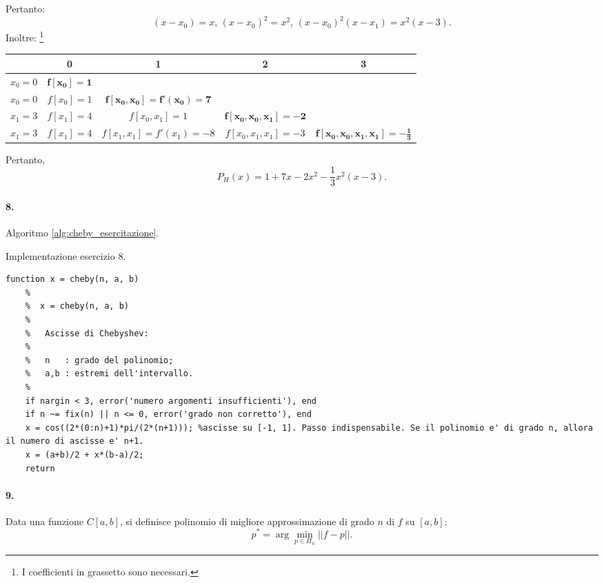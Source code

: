 \noindent Pertanto:
\begin{equation*}
    (x-x_0)=x,\, (x-x_0)^2 = x^2,\, (x-x_0)^2(x-x_1) = x^2(x-3).
\end{equation*}
Inoltre: \footnote{I coefficienti in grassetto sono necessari.}
\begin{center}
    \begin{tabular}{c|cccc}
         & 0 & 1 & 2 & 3\\
         \hline
         $x_0 = 0$ & $\boldsymbol{f[x_0]=1}$\\ 
         $x_0 = 0$ & $f[x_0]=1$ & $\boldsymbol{f[x_0,x_0]=f'(x_0)=7}$\\
         $x_1=3$ & $f[x_1]=4$ & $f[x_0,x_1]=1$ & $\boldsymbol{f[x_0,x_0,x_1]=-2}$\\
         $x_1=3$ & $f[x_1]=4$ & $f[x_1,x_1]=f'(x_1)=-8$ & $f[x_0,x_1,x_1]=-3$ & $\boldsymbol{f[x_0,x_0,x_1,x_1]=-\frac{1}{3}}$
    \end{tabular}
\end{center}
Pertanto,
\begin{equation*}
    P_H(x)=1+7x-2x^2-\frac{1}{3}x^2(x-3).
\end{equation*}

\paragraph{8.} Algoritmo \ref{alg:cheby_esercitazione}.
\begin{algorithm}
\caption{Implementazione esercizio 8.}\label{alg:cheby_esercitazione}
    \begin{lstlisting}[style=Matlab-editor]
    function x = cheby(n, a, b)
    %   
    %  x = cheby(n, a, b)
    %
    %   Ascisse di Chebyshev:
    %
    %   n   : grado del polinomio;
    %   a,b : estremi dell'intervallo.
    %   
    if nargin < 3, error('numero argomenti insufficienti'), end
    if n ~= fix(n) || n <= 0, error('grado non corretto'), end
    x = cos((2*(0:n)+1)*pi/(2*(n+1))); %ascisse su [-1, 1]. Passo indispensabile. Se il polinomio e' di grado n, allora il numero di ascisse e' n+1.
    x = (a+b)/2 + x*(b-a)/2;
    return
    \end{lstlisting}
\end{algorithm}

\paragraph{9.} Data una funzione $C[a,b]$, si definisce polinomio di migliore approssimazione di grado $n$ di $f$ su $[a,b]$:
\begin{equation*}
    p^* = \arg\underset{p\in\Pi_n}{\min}||f-p||.
\end{equation*}

